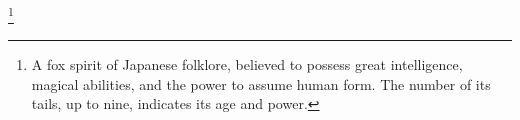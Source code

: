 \footnote{A fox spirit of Japanese folklore, believed to possess great intelligence, magical abilities, and the power to assume human form. The number of its tails, up to nine, indicates its age and power.}